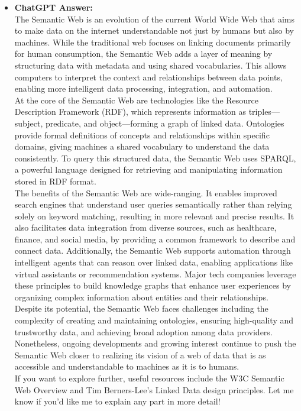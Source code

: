 \documentclass[fleqn,moreauthors,10pt]{ds_report}
\begin{document}
\begin{itemize}
  \item \textbf{ChatGPT Answer:} \\
  The Semantic Web is an evolution of the current World Wide Web that aims to make data on the internet understandable not just by humans but also by machines. While the traditional web focuses on linking documents primarily for human consumption, the Semantic Web adds a layer of meaning by structuring data with metadata and using shared vocabularies. This allows computers to interpret the context and relationships between data points, enabling more intelligent data processing, integration, and automation. \\[6pt]
  At the core of the Semantic Web are technologies like the Resource Description Framework (RDF), which represents information as triples—subject, predicate, and object—forming a graph of linked data. Ontologies provide formal definitions of concepts and relationships within specific domains, giving machines a shared vocabulary to understand the data consistently. To query this structured data, the Semantic Web uses SPARQL, a powerful language designed for retrieving and manipulating information stored in RDF format. \\[6pt]
  The benefits of the Semantic Web are wide-ranging. It enables improved search engines that understand user queries semantically rather than relying solely on keyword matching, resulting in more relevant and precise results. It also facilitates data integration from diverse sources, such as healthcare, finance, and social media, by providing a common framework to describe and connect data. Additionally, the Semantic Web supports automation through intelligent agents that can reason over linked data, enabling applications like virtual assistants or recommendation systems. Major tech companies leverage these principles to build knowledge graphs that enhance user experiences by organizing complex information about entities and their relationships. \\[6pt]
  Despite its potential, the Semantic Web faces challenges including the complexity of creating and maintaining ontologies, ensuring high-quality and trustworthy data, and achieving broad adoption among data providers. Nonetheless, ongoing developments and growing interest continue to push the Semantic Web closer to realizing its vision of a web of data that is as accessible and understandable to machines as it is to humans. \\[6pt]
  If you want to explore further, useful resources include the W3C Semantic Web Overview and Tim Berners-Lee’s Linked Data design principles. Let me know if you'd like me to explain any part in more detail!


\end{itemize}
\end{document}
